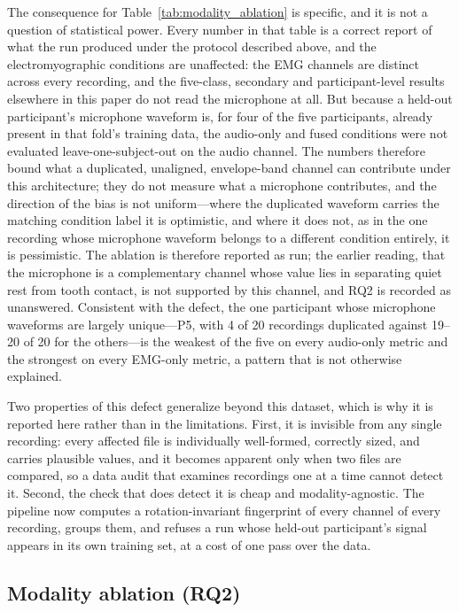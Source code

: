 \documentclass[pdflatex,sn-nature,iicol]{sn-jnl}
\begin{document}
The consequence for Table~\ref{tab:modality_ablation} is specific, and it is not a question of statistical power. Every number in that table is a correct report of what the run produced under the protocol described above, and the electromyographic conditions are unaffected: the EMG channels are distinct across every recording, and the five-class, secondary and participant-level results elsewhere in this paper do not read the microphone at all. But because a held-out participant's microphone waveform is, for four of the five participants, already present in that fold's training data, the audio-only and fused conditions were not evaluated leave-one-subject-out on the audio channel. The numbers therefore bound what a duplicated, unaligned, envelope-band channel can contribute under this architecture; they do not measure what a microphone contributes, and the direction of the bias is not uniform---where the duplicated waveform carries the matching condition label it is optimistic, and where it does not, as in the one recording whose microphone waveform belongs to a different condition entirely, it is pessimistic. The ablation is therefore reported as run; the earlier reading, that the microphone is a complementary channel whose value lies in separating quiet rest from tooth contact, is not supported by this channel, and RQ2 is recorded as unanswered. Consistent with the defect, the one participant whose microphone waveforms are largely unique---P5, with 4 of 20 recordings duplicated against 19--20 of 20 for the others---is the weakest of the five on every audio-only metric and the strongest on every EMG-only metric, a pattern that is not otherwise explained.

Two properties of this defect generalize beyond this dataset, which is why it is reported here rather than in the limitations. First, it is invisible from any single recording: every affected file is individually well-formed, correctly sized, and carries plausible values, and it becomes apparent only when two files are compared, so a data audit that examines recordings one at a time cannot detect it. Second, the check that does detect it is cheap and modality-agnostic. The pipeline now computes a rotation-invariant fingerprint of every channel of every recording, groups them, and refuses a run whose held-out participant's signal appears in its own training set, at a cost of one pass over the data.

\subsection{Modality ablation (RQ2)}
\end{document}
